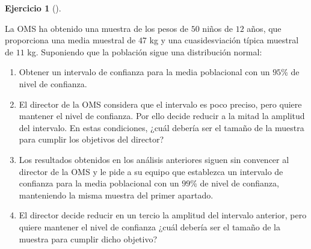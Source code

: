 \documentclass[
  spanish,
  a4paper,
]{scrreport}
\theoremstyle{definition}
\newtheorem{exercise}{Ejercicio}[chapter]
\theoremstyle{remark}
\begin{document}
\begin{exercise}[]\protect\hypertarget{exr-intervalo-confianza-media-peso}{}\label{exr-intervalo-confianza-media-peso}

La OMS ha obtenido una muestra de los pesos de \(50\) niños de \(12\)
años, que proporciona una media muestral de \(47\) kg y una
cuasidesviación típica muestral de \(11\) kg. Suponiendo que la
población sigue una distribución normal:

\begin{enumerate}
\def\labelenumi{\alph{enumi}.}
\item
  Obtener un intervalo de confianza para la media poblacional con un
  \(95\)\% de nivel de confianza.
\item
  El director de la OMS considera que el intervalo es poco preciso, pero
  quiere mantener el nivel de confianza. Por ello decide reducir a la
  mitad la amplitud del intervalo. En estas condiciones, ¿cuál debería
  ser el tamaño de la muestra para cumplir los objetivos del director?
\item
  Los resultados obtenidos en los análisis anteriores siguen sin
  convencer al director de la OMS y le pide a su equipo que establezca
  un intervalo de confianza para la media poblacional con un \(99\)\% de
  nivel de confianza, manteniendo la misma muestra del primer apartado.
\item
  El director decide reducir en un tercio la amplitud del intervalo
  anterior, pero quiere mantener el nivel de confianza ¿cuál debería ser
  el tamaño de la muestra para cumplir dicho objetivo?
\end{enumerate}

\end{exercise}
\end{document}
